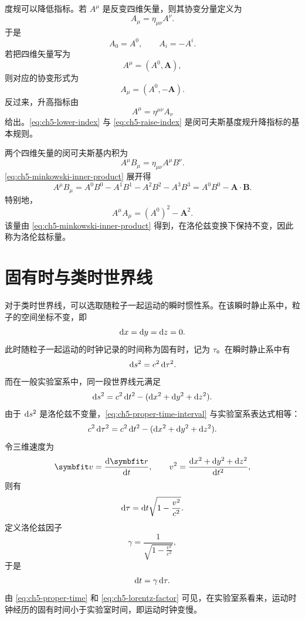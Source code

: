 度规可以降低指标。若 $A^{\mu}$ 是反变四维矢量，则其协变分量定义为
\begin{equation}
\label{eq:ch5-lower-index}
A_{\mu}=\eta_{\mu\nu}A^{\nu}.
\end{equation}
于是
\[
A_{0}=A^{0},\qquad A_{i}=-A^{i}.
\]
若把四维矢量写为
\[
A^{\mu}=(A^{0},\bm{A}),
\]
则对应的协变形式为
\[
A_{\mu}=(A^{0},-\bm{A}).
\]
反过来，升高指标由
\begin{equation}
\label{eq:ch5-raise-index}
A^{\mu}=\eta^{\mu\nu}A_{\nu}
\end{equation}
给出。\eqref{eq:ch5-lower-index} 与 \eqref{eq:ch5-raise-index} 是闵可夫斯基度规升降指标的基本规则。

两个四维矢量的闵可夫斯基内积为
\begin{equation}
\label{eq:ch5-minkowski-inner-product}
A^{\mu} B_{\mu}=\eta_{\mu\nu}A^{\mu} B^{\nu}.
\end{equation}
\eqref{eq:ch5-minkowski-inner-product} 展开得
\[
A^{\mu} B_{\mu}=A^{0}B^{0}-A^{1}B^{1}-A^{2}B^{2}-A^{3}B^{3}
=A^{0}B^{0}-\bm{A}\cdot\bm{B}.
\]
特别地，
\[
A^{\mu} A_{\mu}=(A^{0})^{2}-\bm{A}^{2}.
\]
该量由 \eqref{eq:ch5-minkowski-inner-product} 得到，在洛伦兹变换下保持不变，因此称为洛伦兹标量。

\section{固有时与类时世界线}

对于类时世界线，可以选取随粒子一起运动的瞬时惯性系。在该瞬时静止系中，粒子的空间坐标不变，即
\[
\mathop{}\!\mathrm{d} x=\mathop{}\!\mathrm{d} y=\mathop{}\!\mathrm{d} z=0.
\]
此时随粒子一起运动的时钟记录的时间称为固有时，记为 $\tau$。在瞬时静止系中有
\begin{equation}
\label{eq:ch5-proper-time-interval}
\mathop{}\!\mathrm{d} s^{2}=c^{2}\mathop{}\!\mathrm{d}\tau^{2}.
\end{equation}
而在一般实验室系中，同一段世界线元满足
\[
\mathop{}\!\mathrm{d} s^{2}=c^{2}\mathop{}\!\mathrm{d} t^{2}-(\mathop{}\!\mathrm{d} x^{2}+\mathop{}\!\mathrm{d} y^{2}+\mathop{}\!\mathrm{d} z^{2}).
\]
由于 $\mathop{}\!\mathrm{d} s^{2}$ 是洛伦兹不变量，\eqref{eq:ch5-proper-time-interval} 与实验室系表达式相等：
\[
c^{2}\mathop{}\!\mathrm{d}\tau^{2}=c^{2}\mathop{}\!\mathrm{d} t^{2}-(\mathop{}\!\mathrm{d} x^{2}+\mathop{}\!\mathrm{d} y^{2}+\mathop{}\!\mathrm{d} z^{2}).
\]
令三维速度为
\[
\bm{v}=\frac{\dif\bm{r}}{\dif t},
\qquad
v^{2}=\frac{\dif x^{2}+\dif y^{2}+\dif z^{2}}{\dif t^{2}},
\]
则有
\begin{equation}
\label{eq:ch5-proper-time}
\mathop{}\!\mathrm{d}\tau=\mathop{}\!\mathrm{d} t\sqrt{1-\frac{v^{2}}{c^{2}}}.
\end{equation}
定义洛伦兹因子
\begin{equation}
\label{eq:ch5-lorentz-factor}
\gamma=\frac{1}{\sqrt{1-\frac{v^{2}}{c^{2}}}},
\end{equation}
于是
\[
\mathop{}\!\mathrm{d} t=\gamma\mathop{}\!\mathrm{d}\tau.
\]
由 \eqref{eq:ch5-proper-time} 和 \eqref{eq:ch5-lorentz-factor} 可见，在实验室系看来，运动时钟经历的固有时间小于实验室时间，即运动时钟变慢。

